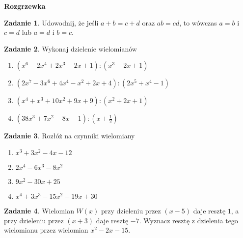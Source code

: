 \documentclass{uoom}
\theoremstyle{definition}
\newtheorem{zadd}{Zadanie}
\newenvironment{zadanie}{
  \begin{zadd}
  }
  {
    \end{zadd}\vspace{\ooodstep}
  }
\begin{document}
\noindent\makebox[\linewidth]{\rule{\textwidth}{0.4pt}}

\noindent\textbf{Rozgrzewka}

  \begin{zadanie}
    Udowodnij, że jeśli $a+b=c+d$ oraz $ab=cd$, to wówczas $a=b$ i $c=d$ lub $a=d$ i $b=c$.
  \end{zadanie}

  \begin{zadanie}
    Wykonaj dzielenie wielomianów
    \begin{enumerate}
      \item $(x^6-2x^4+2x^3-2x+1):(x^3-2x+1)$
      \item $(2x^7-3x^6+4x^4-x^2+2x+4):(2x^5+x^4-1)$
      \item $(x^4+x^3+10x^2+9x+9):(x^2+2x+1)$ %
      \item $(38x^3+7x^2-8x-1):(x+\frac{1}{2})$
    \end{enumerate}
  \end{zadanie}

  \begin{zadanie}
    Rozłóż na czynniki wielomiany
    \begin{enumerate}
      \item $x^3+3x^2-4x-12$
      \item $2x^4-6x^3-8x^2$
      \item $9x^2-30x+25$
      \item $x^4+3x^3-15x^2-19x+30$
    \end{enumerate}
  \end{zadanie}

  \bigskip
\noindent\makebox[\linewidth]{\rule{\textwidth}{0.4pt}}

\begin{zadanie}
  Wielomian $W(x)$ przy dzieleniu przez $(x-5)$ daje resztę $1$, a przy dzieleniu przez $(x+3)$ daje resztę $-7$. Wyznacz resztę z dzielenia tego wielomianu przez wielomian $x^2-2x-15$.
\end{zadanie}
\end{document}
